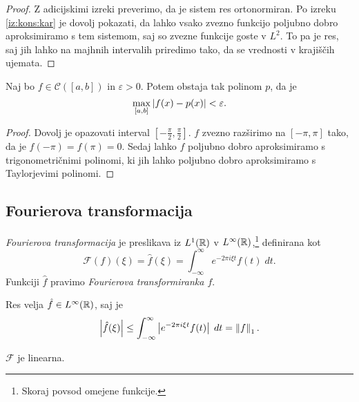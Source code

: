 \begin{proof}
Z adicijskimi izreki preverimo, da je sistem res ortonormiran.
Po izreku \ref{iz:kons:kar} je dovolj pokazati, da lahko vsako
zvezno funkcijo poljubno dobro aproksimiramo s tem sistemom, saj so
zvezne funkcije goste v $L^2$. To pa je res, saj jih lahko na
majhnih intervalih priredimo tako, da se vrednosti v krajiščih
ujemata.
\end{proof}

\begin{izrek}[Weierstrass]
Naj bo $f \in \mathcal{C}([a,b])$ in $\varepsilon > 0$. Potem
obstaja tak polinom $p$, da je
\[
\max_{[a,b]} \left\lvert f(x) - p(x)\right\rvert < \varepsilon.
\]
\end{izrek}

\begin{proof}
Dovolj je opazovati interval
$\left[-\frac{\pi}{2},\frac{\pi}{2}\right]$. $f$ zvezno razširimo
na $[-\pi,\pi]$ tako, da je $f(-\pi)=f(\pi)=0$. Sedaj lahko $f$
poljubno dobro aproksimiramo s trigonometričnimi polinomi, ki jih
lahko poljubno dobro aproksimiramo s Taylorjevimi polinomi.
\end{proof}

\newpage

\subsection{Fourierova transformacija}

\begin{okvir}
\begin{definicija}
\emph{Fourierova transformacija}
je preslikava iz $L^1(\mathbb{R})$ v $L^\infty(\mathbb{R})$,\footnote{Skoraj povsod
omejene funkcije.} definirana kot
\[
\mathcal{F}(f)(\xi) = \hat{f}(\xi) =
\int_{-\infty}^\infty e^{-2\pi i \xi t} f(t)\;dt.
\]
Funkciji $\hat{f}$ pravimo
\emph{Fourierova transformiranka $f$}.
\end{definicija}
\end{okvir}

\begin{opomba}
Res velja $\hat{f} \in L^\infty(\mathbb{R})$, saj je
\[
\left\lvert \hat{f}(\xi)\right\rvert \leq
\int_{-\infty}^\infty \left\lvert e^{-2\pi i \xi t} f(t)\right\rvert\;dt =
\left\lVert f\right\rVert_1.
\]
\end{opomba}

\begin{opomba}
$\mathcal{F}$ je linearna.
\end{opomba}

